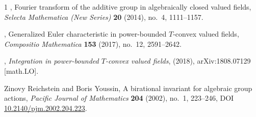 \documentclass[12pt]{amsart}
\theoremstyle{plain}
\theoremstyle{definition}
\theoremstyle{remark}
\numberwithin{equation}{section}
\theoremstyle{plain}
\newcommand{\0}{\emptyset}
\begin{document}
\begin{thebibliography}{1}
\bysame, {{F}ourier transform of the additive group in algebraically
  closed valued fields}, {\em Selecta Mathematica (New Series)} \textbf{20} (2014), no.~4,
  1111--1157.

\bysame, {Generalized {E}uler characteristic in power-bounded {$T$}-convex
  valued fields}, {\em Compositio Mathematica} \textbf{153} (2017), no.~12,
  2591--2642.

\bysame, \emph{Integration in power-bounded {$T$}-convex valued fields},
  (2018), arXiv:1808.07129 [math.LO].


Zinovy Reichstein and Boris Youssin,
{A birational invariant for algebraic group actions},
{\em Pacific Journal of Mathematics} \textbf{204} (2002), no.~1,
223--246, DOI \href{https://doi.org/10.2140/pjm.2002.204.223}{10.2140/pjm.2002.204.223}.

\end{thebibliography}
\end{document}
